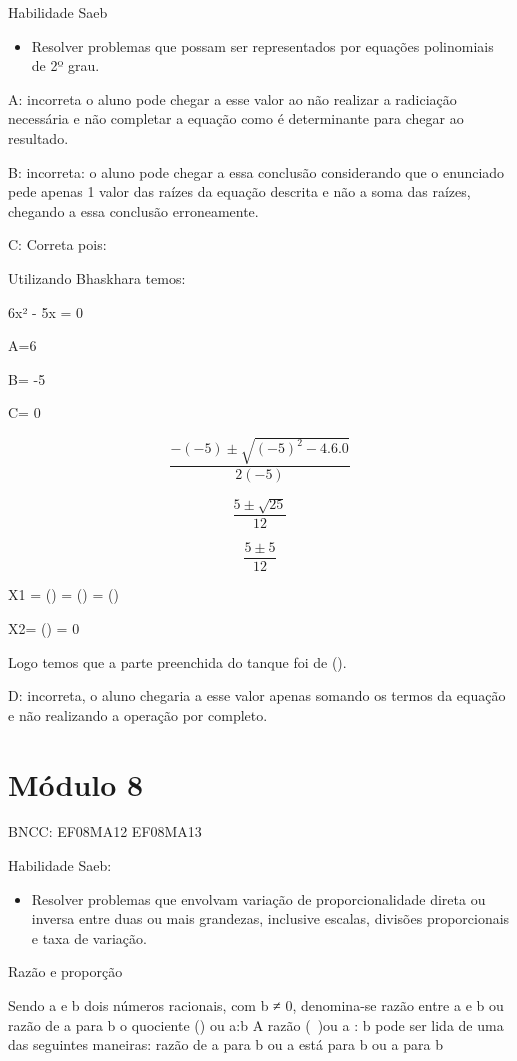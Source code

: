 Habilidade Saeb

\begin{itemize}
\tightlist
\item
  Resolver problemas que possam ser representados por equações
  polinomiais de 2º grau.
\end{itemize}

A: incorreta o aluno pode chegar a esse valor ao não realizar a
radiciação necessária e não completar a equação como é determinante para
chegar ao resultado.

B: incorreta: o aluno pode chegar a essa conclusão considerando que o
enunciado pede apenas 1 valor das raízes da equação descrita e não a
soma das raízes, chegando a essa conclusão erroneamente.

C: Correta pois:

Utilizando Bhaskhara temos:

6x² - 5x = 0

A=6

B= -5

C= 0

\[\frac{- ( - 5) \pm \sqrt{{( - 5)}^{2} - 4.6.0}}{2( - 5)}\]

\[\frac{5 \pm \sqrt{25}}{12}\]

\[\frac{5 \pm 5}{12}\]

X1 = () = () = ()

X2= () = 0

Logo temos que a parte preenchida do tanque foi de ().

D: incorreta, o aluno chegaria a esse valor apenas somando os termos da
equação e não realizando a operação por completo.

\section{Módulo 8}

BNCC: EF08MA12 EF08MA13

Habilidade Saeb:

\begin{itemize}
\tightlist
\item
  Resolver problemas que envolvam variação de proporcionalidade direta
  ou inversa entre duas ou mais grandezas, inclusive escalas, divisões
  proporcionais e taxa de variação.
\end{itemize}

Razão e proporção

Sendo a e b dois números racionais, com b ≠ 0, denomina-se razão entre a
e b ou razão de a para b o quociente () ou a:b A razão
(\ )ou a : b pode ser lida de uma das seguintes maneiras:
razão de a para b ou a está para b ou a para b

